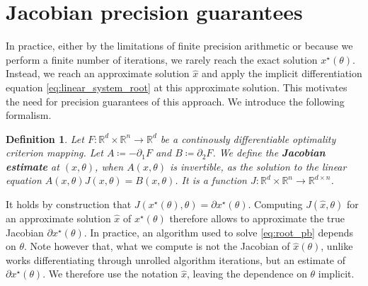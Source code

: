 \documentclass{article}
\def\RR{{\mathbb R}}
\newtheorem{definition}{Definition}
\begin{document}
\section{Jacobian precision guarantees}
\label{sec:jac_bounds}


In practice, either by the limitations of finite precision arithmetic or because
we perform a finite number of iterations, we rarely reach the exact solution
$x^\star(\theta)$. Instead, we reach an approximate solution
$\hat{x}$ and apply the implicit differentiation equation 
\eqref{eq:linear_system_root} at this approximate solution. This motivates the
need for precision guarantees of this approach. We introduce the following
formalism.

\begin{definition}
\label{DEF:jac-est}
Let $F:\RR^d \times \RR^n \to \RR^d$ be a continously differentiable optimality criterion mapping.
Let $A \coloneqq -\partial_1 F$ and $B \coloneqq \partial_2 F$.
We define the \textbf{Jacobian estimate} at $(x, \theta)$, when $A(x,\theta)$ is
invertible,
as the solution to the linear equation
$A(x, \theta) J(x, \theta) = B(x, \theta)$.
It is a function $J: \RR^d \times \RR^n \to \RR^{d \times n}$.
\end{definition}
It holds by construction that
$J(x^\star(\theta), \theta) = \partial x^\star(\theta)$.
Computing $J(\hat x, \theta)$ for an approximate solution $\hat
x$ of $x^\star(\theta)$ therefore
allows to approximate the true Jacobian
$\partial x^\star(\theta)$. In practice, an algorithm used to solve
\eqref{eq:root_pb} depends on $\theta$. Note however that, what we
compute is not the Jacobian of $\hat x(\theta)$, unlike works
differentiating through unrolled algorithm iterations, but an
estimate of $\partial x^\star(\theta)$. We therefore use the notation
$\hat x$, leaving the dependence on $\theta$ implicit.
\end{document}
